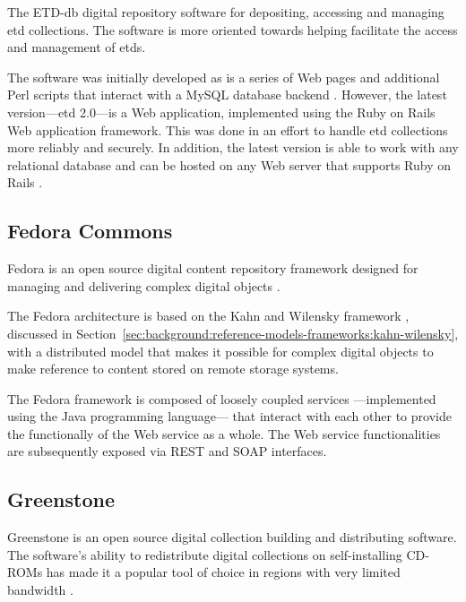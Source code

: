 The ETD-db digital repository software for depositing, accessing and managing \gls{etd} collections. The software is more oriented towards helping facilitate the access and management of \glspl{etd}.

The software was initially developed as is a series of Web pages and additional Perl scripts that interact with a MySQL database backend \citep{ETDdbHome}. However, the latest version---\gls{etd} 2.0---is a Web application, implemented using the Ruby on Rails Web application framework. This was done in an effort to handle \gls{etd} collections more reliably and securely. In addition, the latest version is able to work with any relational database and can be hosted on any Web server that supports Ruby on Rails \citep{Park2011}.

\subsection{Fedora Commons}

Fedora is an open source digital content repository framework designed for managing and delivering complex digital objects \citep{Lagoze2006}.

The Fedora architecture is based on the Kahn and Wilensky framework \citep{Kahn2006}, discussed in Section~\ref{sec:background:reference-models-frameworks:kahn-wilensky}, with a distributed model that makes it possible for complex digital objects to make reference to content stored on remote storage systems. 

The Fedora framework is composed of loosely coupled services ---implemented using the Java programming language--- that interact with each other to provide the functionally of the Web service as a whole. The Web service functionalities are subsequently exposed via REST and SOAP interfaces.

\subsection{Greenstone}

Greenstone is an open source digital collection building and distributing software. The software's ability to redistribute digital collections on self-installing CD-ROMs has made it a popular tool of choice in regions with very limited bandwidth \citep{Witten2001}.

